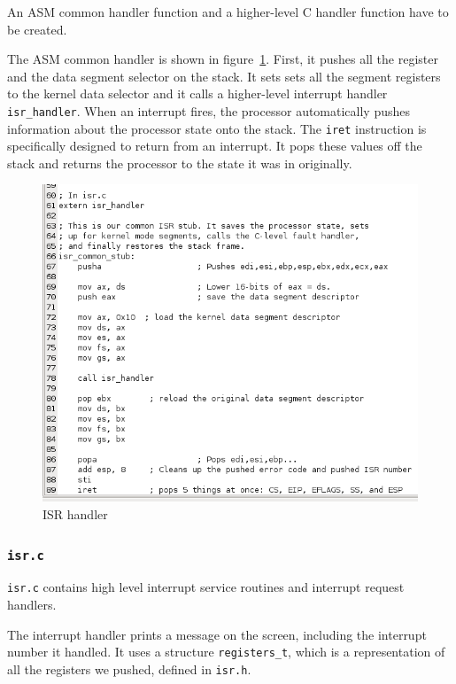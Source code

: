 \documentclass{report}
\begin{document}
An ASM common handler function and a higher-level C handler function have to be created.

The ASM common handler is shown in figure~\ref{isr_handler}. First, it pushes all the register and the data segment selector on the stack. It sets sets all the segment registers to the kernel data selector and it calls a higher-level interrupt handler \texttt{isr\_handler}. When an interrupt fires, the processor automatically pushes information about the processor state onto the stack. The \texttt{iret} instruction is specifically designed to return from an interrupt. It pops these values off the stack and returns the processor to the state it was in originally. 

\begin{figure}[hbtp]
\centering
\includegraphics[scale=0.4]{images/es02/isr_handler.png}
\caption{ISR handler}
\label{isr_handler}
\end{figure}

\subsubsection*{\texttt{isr.c}}
\texttt{isr.c} contains high level interrupt service routines and interrupt request handlers.

The interrupt handler prints a message on the screen, including the interrupt number it handled. It uses a structure \texttt{registers\_t}, which is a representation of all the registers we pushed, defined in \texttt{isr.h}.
\end{document}
